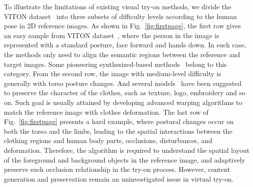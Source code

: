 \documentclass[10pt,twocolumn,letterpaper]{article}
\begin{document}
To illustrate the limitations of existing visual try-on methods,
we divide the VITON dataset~\cite{DBLP:conf/cvpr/HanWWYD18} into three subsets of difficulty levels according to the human pose in 2D reference images.
As shown in Fig.~\ref{fig:firstpage}, the first row gives an easy sample from VITON dataset~\cite{DBLP:conf/cvpr/HanWWYD18}, where the person in the image is represented with a standard posture, \ie face forward and hands down.
In such case, the methods only need to align the semantic regions between the reference and target images.
Some pioneering synthesized-based methods~\cite{DBLP:conf/iccvw/JetchevB17,DBLP:conf/intcompsymp/ChenTC18,DBLP:conf/eccv/RajSCHCL18,DBLP:conf/cvpr/ChoiCKH0C18,DBLP:journals/corr/abs-1906-07251} belong to this category.
From the second row, the image with medium-level difficulty is generally with torso posture changes.
And several models~\cite{DBLP:conf/cvpr/HanWWYD18,DBLP:conf/eccv/WangZLCLY18,DBLP:journals/corr/abs-1902-11026,Yu_2019_ICCV} have been suggested to preserve the character of the clothes, such as texture, logo, embroidery and so on.
Such goal is usually attained by developing advanced warping algorithms to match the reference image with clothes deformation.
The last row of Fig.~\ref{fig:firstpage} presents a hard example,
where postural changes occur on both the torso and the limbs, leading to the spatial interactions between the clothing regions and human body parts, \eg occlusions, disturbances, and deformation.
Therefore, the algorithm is required to understand the spatial layout of the foreground and background objects in the reference image,
and adaptively preserve such occlusion relationship in the try-on process.
However, content generation and preservation remain an uninvestigated issue in virtual try-on.
\end{document}
